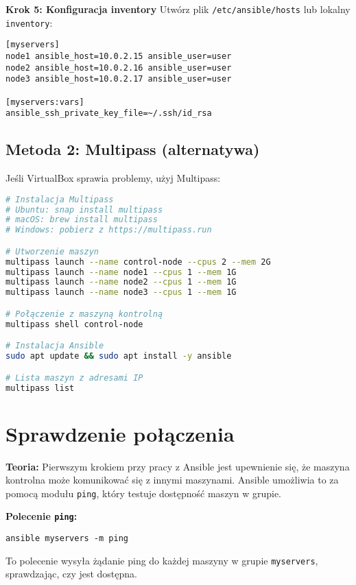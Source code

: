\documentclass{article}
\begin{document}
\textbf{Krok 5: Konfiguracja inventory}
Utwórz plik \texttt{/etc/ansible/hosts} lub lokalny \texttt{inventory}:
\begin{lstlisting}
[myservers]
node1 ansible_host=10.0.2.15 ansible_user=user
node2 ansible_host=10.0.2.16 ansible_user=user  
node3 ansible_host=10.0.2.17 ansible_user=user

[myservers:vars]
ansible_ssh_private_key_file=~/.ssh/id_rsa
\end{lstlisting}

\subsection*{Metoda 2: Multipass (alternatywa)}

Jeśli VirtualBox sprawia problemy, użyj Multipass:

\begin{lstlisting}[language=bash]
# Instalacja Multipass
# Ubuntu: snap install multipass
# macOS: brew install multipass
# Windows: pobierz z https://multipass.run

# Utworzenie maszyn
multipass launch --name control-node --cpus 2 --mem 2G
multipass launch --name node1 --cpus 1 --mem 1G  
multipass launch --name node2 --cpus 1 --mem 1G
multipass launch --name node3 --cpus 1 --mem 1G

# Połączenie z maszyną kontrolną
multipass shell control-node

# Instalacja Ansible
sudo apt update && sudo apt install -y ansible

# Lista maszyn z adresami IP
multipass list
\end{lstlisting}

\section{Sprawdzenie połączenia}

\textbf{Teoria:}  
Pierwszym krokiem przy pracy z Ansible jest upewnienie się, że maszyna kontrolna może komunikować się z innymi maszynami. Ansible umożliwia to za pomocą modułu \texttt{ping}, który testuje dostępność maszyn w grupie.

\textbf{Polecenie \texttt{ping}:}

\noindent\begin{lstlisting}
ansible myservers -m ping
\end{lstlisting}

To polecenie wysyła żądanie ping do każdej maszyny w grupie \texttt{myservers}, sprawdzając, czy jest dostępna.
\end{document}
